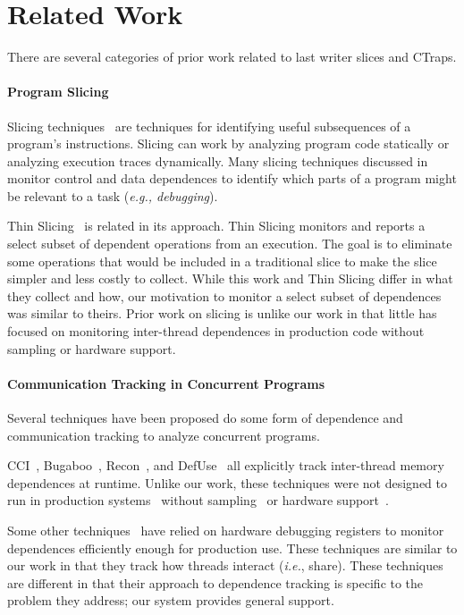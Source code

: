 \documentclass[preprint,9pt]{sigplanconf}
\newcommand{\ctraps}{CTraps\xspace}
\begin{document}
\section{Related Work}

There are several categories of prior work related to last writer slices and \ctraps.  

\paragraph{Program Slicing}
Slicing techniques~\cite{tipslicingsurvey} are techniques for
identifying useful subsequences of a program's instructions.   Slicing can work
by analyzing program code statically or analyzing execution traces dynamically.
Many slicing techniques discussed in ~\cite{tipslicingsurvey} monitor control and
data dependences to identify which parts of a program might be relevant to a
task ({\em e.g., debugging}).

Thin Slicing~\cite{thinslicing} is related in its approach. Thin
Slicing monitors and reports a select subset of dependent operations from an
execution.  The goal is to eliminate some operations that would be included in a traditional
slice to make the slice simpler and less costly to collect.  While this work and
Thin Slicing differ in what they collect and how, our motivation to monitor a
select subset of dependences was similar to theirs.    Prior work
on slicing is unlike our work in that little has focused on monitoring
inter-thread dependences in production code without sampling or hardware support.

\paragraph{Communication Tracking in Concurrent Programs}
Several techniques have been proposed do some form of dependence and
communication tracking to analyze concurrent programs.  

CCI~\cite{cci}, Bugaboo~\cite{bugaboo}, Recon~\cite{recon}, and
DefUse~\cite{defuse} all explicitly track inter-thread memory dependences at
runtime.  Unlike our work, these techniques were not designed to run in
production systems~\cite{recon,defuse} without sampling~\cite{cci} or hardware
support~\cite{bugaboo}.  

Some other techniques~\cite{threadclustering,threadcriticality} have relied on
hardware debugging registers to monitor dependences efficiently enough for
production use.  These techniques are similar to our work in that they track how
threads interact ({\em i.e.}, share).  These techniques are different in that
their approach to dependence tracking is specific to the problem they address;
our system provides general support.
\end{document}
